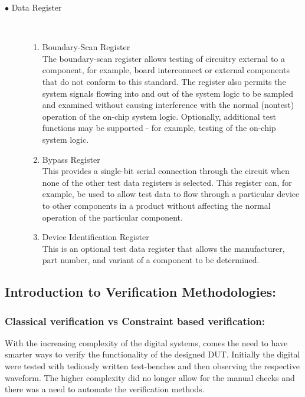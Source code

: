 \documentclass[a4paper,11pt]{article}
\begin{document}
\begin{description}
\begin{center}
\begin{table}[!h]
\begin{tabular}{|c|c|c|c|}
\end{tabular}
\end{table}
\end{center}

\FloatBarrier
\item [$\bullet$ Data Register]
\  \\

\begin{enumerate}[I]%
\item Boundary-Scan Register
\ \\
The boundary-scan register allows testing of circuitry external to a component, for example, board interconnect or external components that do not conform to this standard. The register also permits the system signals flowing into and out of the system logic to be sampled and examined without causing interference with the normal (nontest) operation of the on-chip system logic. Optionally, additional test functions may be supported - for example, testing of the on-chip system logic.

\item Bypass Register
\ \\
This provides a single-bit serial connection through the circuit when none of the other test data registers is selected. This register can, for example, be used to allow test data to flow through a particular device to other components in a product without affecting the normal operation of the particular component. 

\item Device Identification Register
\ \\
This is an optional test data register that allows the manufacturer, part number, and variant of a component to be determined.

\end{enumerate} 

\end{description}


\subsection{Introduction to Verification Methodologies:}


\subsubsection{Classical verification vs Constraint based verification:}

With the increasing complexity of the digital systems, comes the need to have smarter ways to verify the functionality of the designed DUT. Initially the digital were tested with tediously written test-benches and then observing the respective waveform. The higher complexity did no longer allow for the manual checks and there was a need to automate the verification methods.
\end{document}

